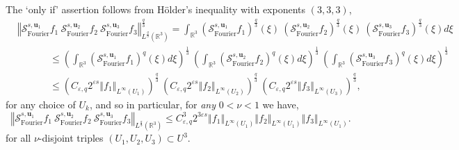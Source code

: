 \documentclass{amsart}%
\theoremstyle{plain}
\numberwithin{equation}{section}
\begin{document}
The `only if' assertion follows from H\"{o}lder's inequality with exponents
$\left(  3,3,3\right)  $,
\begin{align*}
&  \left\Vert \mathcal{S}_{\operatorname*{Fourier}}^{s,\mathbf{u}_{1}}%
f_{1}\ \mathcal{S}_{\operatorname*{Fourier}}^{s,\mathbf{u}_{2}}f_{2}%
\ \mathcal{S}_{\operatorname*{Fourier}}^{s,\mathbf{u}_{3}}f_{3}\right\Vert
_{L^{\frac{q}{3}}\left(  \mathbb{R}^{3}\right)  }^{\frac{q}{3}}=\int
_{\mathbb{R}^{3}}\left(  \mathcal{S}_{\operatorname*{Fourier}}^{s,\mathbf{u}%
_{1}}f_{1}\right)  ^{\frac{q}{3}}\left(  \xi\right)  \ \left(  \mathcal{S}%
_{\operatorname*{Fourier}}^{s,\mathbf{u}_{2}}f_{2}\right)  ^{\frac{q}{3}%
}\left(  \xi\right)  \ \left(  \mathcal{S}_{\operatorname*{Fourier}%
}^{s,\mathbf{u}_{3}}f_{3}\right)  ^{\frac{q}{3}}\left(  \xi\right)  d\xi\\
&  \ \ \ \ \ \ \ \ \ \ \ \ \ \ \ \leq\left(  \int_{\mathbb{R}^{3}}\left(
\mathcal{S}_{\operatorname*{Fourier}}^{s,\mathbf{u}_{1}}f_{1}\right)
^{q}\left(  \xi\right)  d\xi\right)  ^{\frac{1}{3}}\ \left(  \int
_{\mathbb{R}^{3}}\left(  \mathcal{S}_{\operatorname*{Fourier}}^{s,\mathbf{u}%
_{2}}f_{2}\right)  ^{q}\left(  \xi\right)  d\xi\right)  ^{\frac{1}{3}%
}\ \left(  \int_{\mathbb{R}^{3}}\left(  \mathcal{S}_{\operatorname*{Fourier}%
}^{s,\mathbf{u}_{3}}f_{3}\right)  ^{q}\left(  \xi\right)  d\xi\right)
^{\frac{1}{3}}\\
&  \ \ \ \ \ \ \ \ \ \ \ \ \ \ \ \leq\left(  C_{\varepsilon,q}2^{\varepsilon
s}\left\Vert f_{1}\right\Vert _{L^{\infty}\left(  U_{1}\right)  }\right)
^{\frac{q}{3}}\ \left(  C_{\varepsilon,q}2^{\varepsilon s}\left\Vert
f_{2}\right\Vert _{L^{\infty}\left(  U_{2}\right)  }\right)  ^{\frac{q}{3}%
}\ \left(  C_{\varepsilon,q}2^{\varepsilon s}\left\Vert f_{3}\right\Vert
_{L^{\infty}\left(  U_{3}\right)  }\right)  ^{\frac{q}{3}},
\end{align*}
for any choice of $U_{k}$, and so in particular, for \emph{any} $0<\nu<1$ we
have,%
\[
\left\Vert \mathcal{S}_{\operatorname*{Fourier}}^{s,\mathbf{u}_{1}}%
f_{1}\ \mathcal{S}_{\operatorname*{Fourier}}^{s,\mathbf{u}_{2}}f_{2}%
\ \mathcal{S}_{\operatorname*{Fourier}}^{s,\mathbf{u}_{3}}f_{3}\right\Vert
_{L^{\frac{q}{3}}\left(  \mathbb{R}^{3}\right)  }\leq C_{\varepsilon,q}%
^{3}2^{3\varepsilon s}\left\Vert f_{1}\right\Vert _{L^{\infty}\left(
U_{1}\right)  }\left\Vert f_{2}\right\Vert _{L^{\infty}\left(  U_{1}\right)
}\left\Vert f_{3}\right\Vert _{L^{\infty}\left(  U_{1}\right)  }.
\]
for all $\nu$-disjoint triples $\left(  U_{1},U_{2},U_{3}\right)  \subset
U^{3}$.
\end{document}
